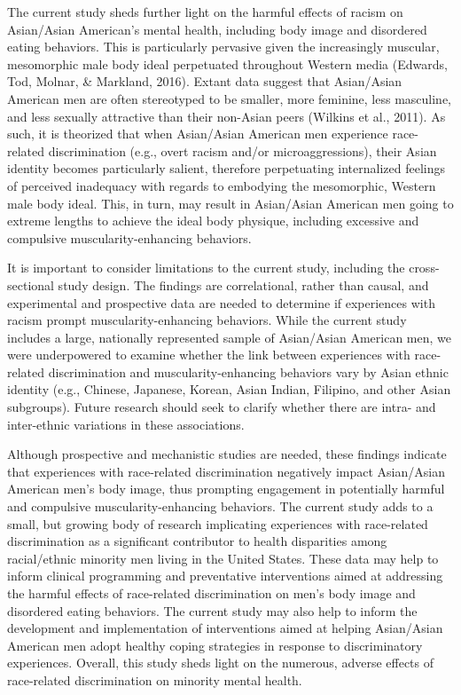 \documentclass[
  english,
  man, fleqn, noextraspace,floatsintext]{apa6}
\begin{document}
The current study sheds further light on the harmful effects of racism on Asian/Asian American's mental health, including body image and disordered eating behaviors. This is particularly pervasive given the increasingly muscular, mesomorphic male body ideal perpetuated throughout Western media (Edwards, Tod, Molnar, \& Markland, 2016). Extant data suggest that Asian/Asian American men are often stereotyped to be smaller, more feminine, less masculine, and less sexually attractive than their non-Asian peers (Wilkins et al., 2011). As such, it is theorized that when Asian/Asian American men experience race-related discrimination (e.g., overt racism and/or microaggressions), their Asian identity becomes particularly salient, therefore perpetuating internalized feelings of perceived inadequacy with regards to embodying the mesomorphic, Western male body ideal. This, in turn, may result in Asian/Asian American men going to extreme lengths to achieve the ideal body physique, including excessive and compulsive muscularity-enhancing behaviors.

It is important to consider limitations to the current study, including the cross-sectional study design. The findings are correlational, rather than causal, and experimental and prospective data are needed to determine if experiences with racism prompt muscularity-enhancing behaviors. While the current study includes a large, nationally represented sample of Asian/Asian American men, we were underpowered to examine whether the link between experiences with race-related discrimination and muscularity-enhancing behaviors vary by Asian ethnic identity (e.g., Chinese, Japanese, Korean, Asian Indian, Filipino, and other Asian subgroups). Future research should seek to clarify whether there are intra- and inter-ethnic variations in these associations.

Although prospective and mechanistic studies are needed, these findings indicate that experiences with race-related discrimination negatively impact Asian/Asian American men's body image, thus prompting engagement in potentially harmful and compulsive muscularity-enhancing behaviors. The current study adds to a small, but growing body of research implicating experiences with race-related discrimination as a significant contributor to health disparities among racial/ethnic minority men living in the United States. These data may help to inform clinical programming and preventative interventions aimed at addressing the harmful effects of race-related discrimination on men's body image and disordered eating behaviors. The current study may also help to inform the development and implementation of interventions aimed at helping Asian/Asian American men adopt healthy coping strategies in response to discriminatory experiences. Overall, this study sheds light on the numerous, adverse effects of race-related discrimination on minority mental health.
\end{document}
